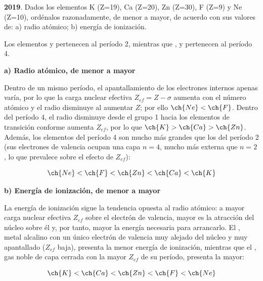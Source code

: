 \begin{exerciseEVAU}
    \textbf{2019}. Dados los elementos K (Z=19), Ca (Z=20), Zn (Z=30), F (Z=9) y Ne (Z=10), ordénalos razonadamente, de menor a mayor, de acuerdo con sus valores de: a) radio atómico; b) energía de ionización.

    \begin{solu}

        Los elementos  y  pertenecen al período 2, mientras que ,  y  pertenecen al período 4.

        \textbf{a) Radio atómico, de menor a mayor}

        Dentro de un mismo período, el apantallamiento de los electrones internos apenas varía, por lo que la carga nuclear efectiva \(Z_{ef} = Z - \sigma\) aumenta con el número atómico y el radio disminuye al aumentar \(Z\); por ello \(\ch{Ne} < \ch{F}\). Dentro del período 4, el radio disminuye desde el grupo 1 hacia los elementos de transición conforme aumenta \(Z_{ef}\), por lo que \(\ch{K} > \ch{Ca} > \ch{Zn}\). Además, los elementos del período 4 son mucho más grandes que los del período 2 (sus electrones de valencia ocupan una capa \(n=4\), mucho más externa que \(n=2\), lo que prevalece sobre el efecto de \(Z_{ef}\)):

        \begin{equation*}
            \ch{Ne} < \ch{F} < \ch{Zn} < \ch{Ca} < \ch{K}
        \end{equation*}

        \textbf{b) Energía de ionización, de menor a mayor}

        La energía de ionización sigue la tendencia opuesta al radio atómico: a mayor carga nuclear efectiva \(Z_{ef}\) sobre el electrón de valencia, mayor es la atracción del núcleo sobre él y, por tanto, mayor la energía necesaria para arrancarlo. El , metal alcalino con un único electrón de valencia muy alejado del núcleo y muy apantallado (\(Z_{ef}\) baja), presenta la menor energía de ionización, mientras que el , gas noble de capa cerrada con la mayor \(Z_{ef}\) de su período, presenta la mayor:

        \begin{equation*}
            \ch{K} < \ch{Ca} < \ch{Zn} < \ch{F} < \ch{Ne}
        \end{equation*}

    \end{solu}
\end{exerciseEVAU}



